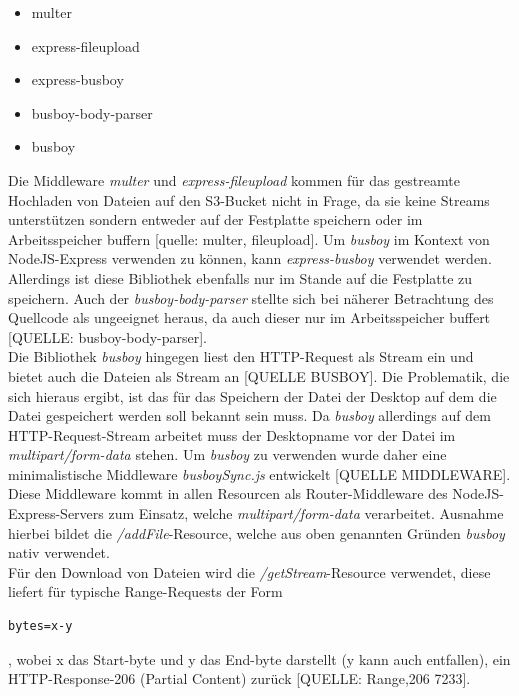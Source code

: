 \documentclass[a4paper, 12pt]{scrreprt}
\begin{document}
\begin{itemize}
\item multer
\item express-fileupload
\item express-busboy
\item busboy-body-parser
\item busboy
\end{itemize}


\noindent Die Middleware \textit{multer} und \textit{express-fileupload} kommen für das gestreamte Hochladen von Dateien auf den S3-Bucket nicht in Frage, da sie keine Streams unterstützen sondern entweder auf der Festplatte speichern  oder im Arbeitsspeicher buffern [quelle: multer, fileupload].
Um \textit{busboy} im Kontext von NodeJS-Express verwenden zu können, kann \textit{express-busboy} verwendet werden. Allerdings ist diese Bibliothek ebenfalls nur im Stande auf die Festplatte zu speichern. Auch der \textit{busboy-body-parser} stellte sich bei näherer Betrachtung des Quellcode als ungeeignet heraus, da auch dieser nur im Arbeitsspeicher buffert [QUELLE: busboy-body-parser].\\
Die Bibliothek \textit{busboy} hingegen liest den HTTP-Request als Stream ein und bietet auch die Dateien als Stream an [QUELLE BUSBOY].
Die Problematik, die sich hieraus ergibt, ist das für das Speichern der Datei der Desktop auf dem die Datei gespeichert werden soll bekannt sein muss. Da \textit{busboy} allerdings auf dem HTTP-Request-Stream arbeitet muss der Desktopname vor der Datei im \textit{multipart/form-data} stehen. Um \textit{busboy} zu verwenden wurde daher eine minimalistische Middleware \textit{busboySync.js} entwickelt [QUELLE MIDDLEWARE].
Diese Middleware kommt in allen Resourcen als Router-Middleware des NodeJS-Express-Servers zum Einsatz, welche \textit{multipart/form-data} verarbeitet. Ausnahme hierbei bildet die \textit{/addFile}-Resource, welche aus oben genannten Gründen \textit{busboy} nativ verwendet.\\
Für den Download von Dateien wird die \textit{/getStream}-Resource verwendet, diese liefert für typische Range-Requests der Form
\begin{lstlisting}
bytes=x-y
\end{lstlisting}
, wobei x das Start-byte und y das End-byte darstellt (y kann auch entfallen), ein HTTP-Response-206 (Partial Content) zurück [QUELLE: Range,206 7233].
\end{document}
